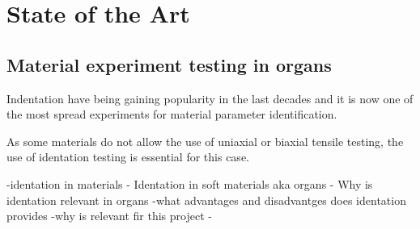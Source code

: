 
\chapter{State of the Art} %

\label{Chapter2} %


\section{Material experiment testing in organs}

Indentation have being gaining popularity in the last decades and it is now one of the most spread experiments for material parameter identification.

As some materials do not allow the use of uniaxial or biaxial tensile testing, the use of identation testing is essential for this case. 

-identation in materials
- Identation in soft materials aka organs
- Why is identation relevant in organs
-what advantages and disadvantges does identation provides
-why is relevant fir this project
- 
